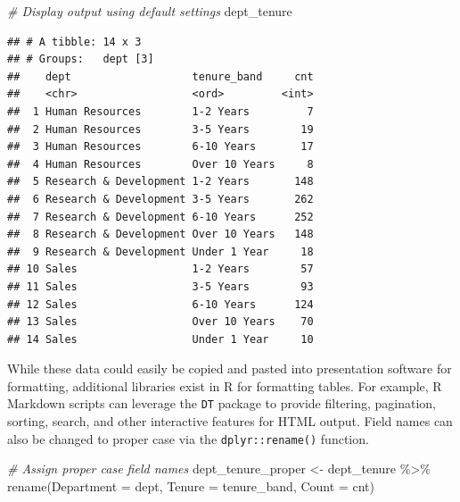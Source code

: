 \documentclass[
]{book}
\newenvironment{Shaded}{\begin{snugshade}}{\end{snugshade}}
\newcommand{\CommentTok}[1]{\textcolor[rgb]{0.56,0.35,0.01}{\textit{#1}}}
\newcommand{\FunctionTok}[1]{\textcolor[rgb]{0.00,0.00,0.00}{#1}}
\newcommand{\NormalTok}[1]{#1}
\newcommand{\OtherTok}[1]{\textcolor[rgb]{0.56,0.35,0.01}{#1}}
\newcommand{\SpecialCharTok}[1]{\textcolor[rgb]{0.00,0.00,0.00}{#1}}
\newcommand{\StringTok}[1]{\textcolor[rgb]{0.31,0.60,0.02}{#1}}
\begin{document}
\begin{Shaded}
\begin{Highlighting}[]
\CommentTok{\# Display output using default settings}
\NormalTok{dept\_tenure}
\end{Highlighting}
\end{Shaded}

\begin{verbatim}
## # A tibble: 14 x 3
## # Groups:   dept [3]
##    dept                   tenure_band     cnt
##    <chr>                  <ord>         <int>
##  1 Human Resources        1-2 Years         7
##  2 Human Resources        3-5 Years        19
##  3 Human Resources        6-10 Years       17
##  4 Human Resources        Over 10 Years     8
##  5 Research & Development 1-2 Years       148
##  6 Research & Development 3-5 Years       262
##  7 Research & Development 6-10 Years      252
##  8 Research & Development Over 10 Years   148
##  9 Research & Development Under 1 Year     18
## 10 Sales                  1-2 Years        57
## 11 Sales                  3-5 Years        93
## 12 Sales                  6-10 Years      124
## 13 Sales                  Over 10 Years    70
## 14 Sales                  Under 1 Year     10
\end{verbatim}

While these data could easily be copied and pasted into presentation software for formatting, additional libraries exist in R for formatting tables. For example, R Markdown scripts can leverage the \texttt{DT} package to provide filtering, pagination, sorting, search, and other interactive features for HTML output. Field names can also be changed to proper case via the \texttt{dplyr::rename()} function.

\begin{Shaded}
\begin{Highlighting}[]
\CommentTok{\# Assign proper case field names}
\NormalTok{dept\_tenure\_proper }\OtherTok{\textless{}{-}}\NormalTok{ dept\_tenure }\SpecialCharTok{\%\textgreater{}\%}
                      \FunctionTok{rename}\NormalTok{(}\StringTok{\textquotesingle{}Department\textquotesingle{}} \OtherTok{=}\NormalTok{ dept,}
                             \StringTok{\textquotesingle{}Tenure\textquotesingle{}} \OtherTok{=}\NormalTok{ tenure\_band,}
                             \StringTok{\textquotesingle{}Count\textquotesingle{}} \OtherTok{=}\NormalTok{ cnt)}
\end{Highlighting}
\end{Shaded}
\end{document}
